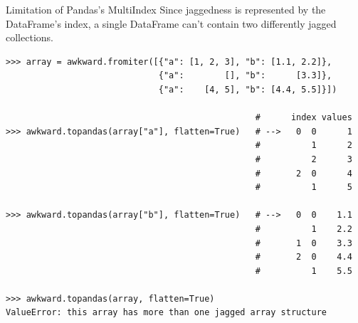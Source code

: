 \documentclass[aspectratio=169]{beamer}
\begin{document}
\begin{frame}[fragile]{Limitation of Pandas's MultiIndex}
\large
\vspace{0.25 cm}
Since jaggedness is represented by the DataFrame's index, a single DataFrame can't contain two differently jagged collections.

\scriptsize
\vspace{0.15 cm}
\begin{verbatim}
>>> array = awkward.fromiter([{"a": [1, 2, 3], "b": [1.1, 2.2]},
                              {"a":        [], "b":      [3.3]},
                              {"a":    [4, 5], "b": [4.4, 5.5]}])

                                                 #      index values
>>> awkward.topandas(array["a"], flatten=True)   # -->   0  0      1
                                                 #          1      2
                                                 #          2      3
                                                 #       2  0      4
                                                 #          1      5

>>> awkward.topandas(array["b"], flatten=True)   # -->   0  0    1.1
                                                 #          1    2.2
                                                 #       1  0    3.3
                                                 #       2  0    4.4
                                                 #          1    5.5

>>> awkward.topandas(array, flatten=True)
ValueError: this array has more than one jagged array structure
\end{verbatim}
\end{frame}
\end{document}
